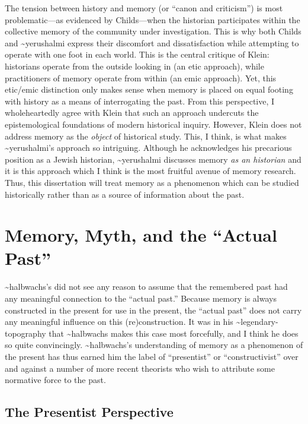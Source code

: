 The tension between history and memory (or ``canon and criticism'') is
most problematic---as evidenced by Childs---when the historian
participates within the collective memory of the community under
investigation. This is why both Childs and \textasciitilde{}yerushalmi
express their discomfort and dissatisfaction while attempting to operate
with one foot in each world. This is the central critique of Klein:
historians operate from the outside looking in (an etic approach), while
practitioners of memory operate from within (an emic approach). Yet,
this etic/emic distinction only makes sense when memory is placed on
equal footing with history as a means of interrogating the past. From
this perspective, I wholeheartedly agree with Klein that such an
approach undercuts the epistemological foundations of modern historical
inquiry. However, Klein does not address memory as the \emph{object} of
historical study. This, I think, is what makes
\textasciitilde{}yerushalmi's approach so intriguing. Although he
acknowledges his precarious position as a Jewish historian,
\textasciitilde{}yerushalmi discusses memory \emph{as an historian} and
it is this approach which I think is the most fruitful avenue of memory
research. Thus, this dissertation will treat memory as a phenomenon
which can be studied historically rather than as a source of information
about the past.

\hypertarget{memory-myth-and-the-actual-past}{%
\section{Memory, Myth, and the ``Actual
Past''}\label{memory-myth-and-the-actual-past}}

\textasciitilde{}halbwachs's did not see any reason to assume that the
remembered past had any meaningful connection to the ``actual past.''
Because memory is always constructed in the present for use in the
present, the ``actual past'' does not carry any meaningful influence on
this (re)construction. It was in his
\textasciitilde{}legendary-topography that \textasciitilde{}halbwachs
makes this case most forcefully, and I think he does so quite
convincingly. \textasciitilde{}halbwachs's understanding of memory as a
phenomenon of the present has thus earned him the label of
``presentist'' or ``constructivist'' over and against a number of more
recent theorists who wish to attribute some normative force to the
past.\autocite[27--30]{coser_halbwachs1992}

\hypertarget{the-presentist-perspective}{%
\subsection{The Presentist
Perspective}\label{the-presentist-perspective}}

